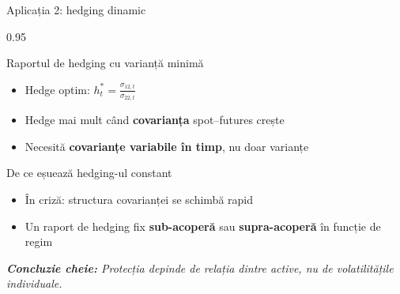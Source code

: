 \documentclass[9pt, aspectratio=169, t]{beamer}
\begin{document}
\begin{frame}{Aplicația 2: hedging dinamic}
    \begin{cminipage}{0.95\textwidth}
    {\footnotesize
    \begin{block}{Raportul de hedging cu varianță minimă}
        \begin{itemize}\setlength{\itemsep}{2pt}
            \item Hedge optim: $h_t^{*} = \frac{\sigma_{12,t}}{\sigma_{22,t}}$
            \item Hedge mai mult când \textbf{covarianța} spot--futures crește
            \item Necesită \textbf{covarianțe variabile în timp}, nu doar varianțe
        \end{itemize}
    \end{block}
    \vspace{0.1cm}
    \begin{alertblock}{De ce eșuează hedging-ul constant}
        \begin{itemize}\setlength{\itemsep}{0pt}
            \item În criză: structura covarianței se schimbă rapid
            \item Un raport de hedging fix \textbf{sub-acoperă} sau \textbf{supra-acoperă} în funcție de regim
        \end{itemize}
    \end{alertblock}
    \vspace{0.2cm}
    \textit{\textbf{Concluzie cheie:} Protecția depinde de relația dintre active, nu de volatilitățile individuale.}
    }
    \end{cminipage}
\end{frame}
\end{document}
